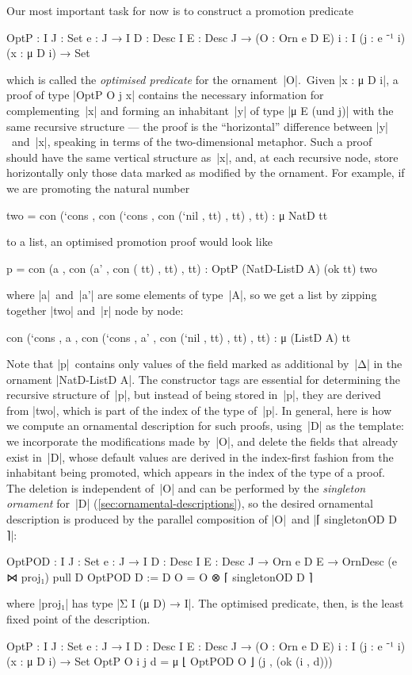 Our most important task for now is to construct a promotion predicate
\begin{spec}
OptP :  {I J : Set} {e : J → I} {D : Desc I} {E : Desc J} →
        (O : Orn e D E) {i : I} (j : e ⁻¹ i) (x : μ D i) → Set
\end{spec}
which is called the \emph{optimised predicate} for the ornament~|O|.\
Given |x : μ D i|, a proof of type |OptP O j x| contains the necessary information for complementing~|x| and forming an inhabitant~|y| of type |μ E (und j)| with the same recursive structure --- the proof is the ``horizontal'' difference between |y|~and~|x|, speaking in terms of the two-dimensional metaphor.
Such a proof should have the same vertical structure as~|x|, and, at each recursive node, store horizontally only those data marked as modified by the ornament.
For example, if we are promoting the natural number
\begin{code}
two =  con (`cons  ,
       con (`cons  ,
       con (`nil   ,
         tt) , tt) , tt) : μ NatD tt
\end{code}
to a list, an optimised promotion proof would look like
\begin{code}
p =  con (a   ,
     con (a'  ,
     con (
       tt) , tt) , tt) : OptP (NatD-ListD A) (ok tt) two
\end{code}
where |a|~and~|a'| are some elements of type~|A|, so we get a list by zipping together |two| and~|r| node by node:
\begin{code}
con (`cons  , a   ,
con (`cons  , a'  ,
con (`nil   ,
  tt) , tt) , tt) : μ (ListD A) tt
\end{code}
Note that |p|~contains only values of the field marked as additional by~|Δ| in the ornament |NatD-ListD A|.
The constructor tags are essential for determining the recursive structure of~|p|, but instead of being stored in~|p|, they are derived from |two|, which is part of the index of the type of~|p|.
In general, here is how we compute an ornamental description for such proofs, using~|D| as the template:
we incorporate the modifications made by~|O|, and delete the fields that already exist in~|D|, whose default values are derived in the index-first fashion from the inhabitant being promoted, which appears in the index of the type of a proof.
The deletion is independent of~|O| and can be performed by the \emph{singleton ornament} for~|D| (\autoref{sec:ornamental-descriptions}), so the desired ornamental description is produced by the parallel composition of |O|~and |⌈ singletonOD D ⌉|:
\begin{code}
OptPOD :  {I J : Set} {e : J → I} {D : Desc I} {E : Desc J} →
          Orn e D E → OrnDesc (e ⋈ proj₁) pull D
OptPOD {D := D} O = O ⊗ ⌈ singletonOD D ⌉
\end{code}
where |proj₁| has type |Σ I (μ D) → I|.
The optimised predicate, then, is the least fixed point of the description.
\begin{code}
OptP :  {I J : Set} {e : J → I} {D : Desc I} {E : Desc J} →
        (O : Orn e D E) {i : I} (j : e ⁻¹ i) (x : μ D i) → Set
OptP O {i} j d = μ ⌊ OptPOD O ⌋ (j , (ok (i , d)))
\end{code}

